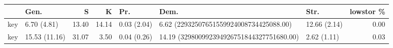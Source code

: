 \begin{tabular}{llrrlllr}
\toprule
     & Gen.          &     S &     K & Pr.         & Dem.                                      & Str.         &   lowstor \% \\
\midrule
 key & 6.70 (4.81)   & 13.40 & 14.14 & 0.03 (2.04) & 6.62 (22932507651559924008734425088.00)   & 12.66 (2.14) &        0.00 \\
 key & 15.53 (11.16) & 31.07 &  3.50 & 0.04 (0.26) & 14.19 (329800992394926751844327751680.00) & 2.62 (1.11)  &        0.03 \\
\bottomrule
\end{tabular}